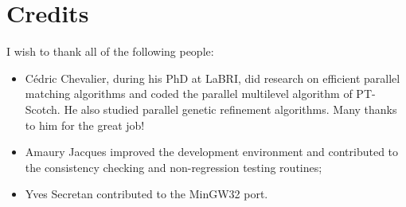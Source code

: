 \documentclass{article}
\newcommand{\ptscotch}{{\sc PT-Scotch}}          %
\begin{document}



\section*{Credits}

I wish to thank all of the following people:
\begin{itemize}
\item
C\'edric Chevalier, during his PhD at LaBRI, did research on efficient
parallel matching algorithms and coded the parallel multilevel
algorithm of \ptscotch. He also studied parallel genetic refinement
algorithms. Many thanks to him for the great job!
\item
Amaury Jacques improved the development environment and contributed to
the consistency checking and non-regression testing routines;
\item
Yves Secretan contributed to the MinGW32 port.
\end{itemize}




\end{document}
